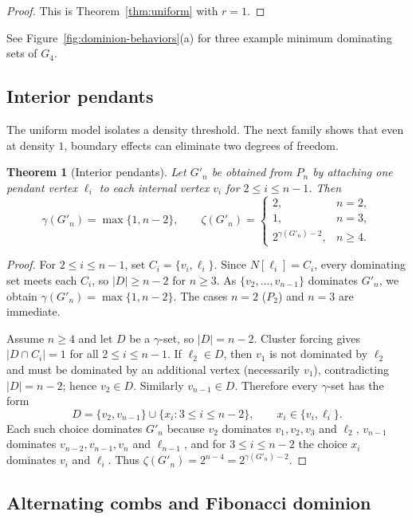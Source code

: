 \documentclass[11pt]{article}
\newtheorem{theorem}{Theorem}
\theoremstyle{definition}
\theoremstyle{remark}
\newcommand{\gam}{\gamma}
\newcommand{\zet}{\zeta}
\begin{document}
\begin{proof}
This is Theorem~\ref{thm:uniform} with $r=1$.
\end{proof}
See Figure~\ref{fig:dominion-behaviors}(a) for three example minimum dominating sets of $G_4$.

\subsection{Interior pendants}
The uniform model isolates a density threshold. The next family shows that even at density $1$, boundary
effects can eliminate two degrees of freedom.

\begin{theorem}[Interior pendants]\label{thm:modified}
Let $G'_n$ be obtained from $P_n$ by attaching one pendant vertex $\ell_i$ to each internal vertex $v_i$
for $2\le i\le n-1$. Then
\[
\gam(G'_n)=\max\{1,n-2\},\qquad
\zet(G'_n)=
\begin{cases}
2,& n=2,\\
1,& n=3,\\
2^{\gam(G'_n)-2},& n\ge 4.
\end{cases}
\]
\end{theorem}

\begin{proof}
For $2\le i\le n-1$, set $C_i=\{v_i,\ell_i\}$. Since $N[\ell_i]=C_i$, every dominating set meets each $C_i$,
so $|D|\ge n-2$ for $n\ge 3$. As $\{v_2,\dots,v_{n-1}\}$ dominates $G'_n$, we obtain
$\gam(G'_n)=\max\{1,n-2\}$. The cases $n=2$ ($P_2$) and $n=3$ are immediate.

Assume $n\ge 4$ and let $D$ be a $\gam$-set, so $|D|=n-2$. Cluster forcing gives $|D\cap C_i|=1$ for all
$2\le i\le n-1$. If $\ell_2\in D$, then $v_1$ is not dominated by $\ell_2$ and must be dominated by an
additional vertex (necessarily $v_1$), contradicting $|D|=n-2$; hence $v_2\in D$. Similarly $v_{n-1}\in D$.
Therefore every $\gam$-set has the form
\[
D=\{v_2,v_{n-1}\}\cup \{x_i: 3\le i\le n-2\},\qquad x_i\in\{v_i,\ell_i\}.
\]
Each such choice dominates $G'_n$ because $v_2$ dominates $v_1,v_2,v_3$ and $\ell_2$, $v_{n-1}$ dominates
$v_{n-2},v_{n-1},v_n$ and $\ell_{n-1}$, and for $3\le i\le n-2$ the choice $x_i$ dominates $v_i$ and $\ell_i$.
Thus $\zet(G'_n)=2^{n-4}=2^{\gam(G'_n)-2}$.
\end{proof}



\subsection{Alternating combs and Fibonacci dominion}
\end{document}
